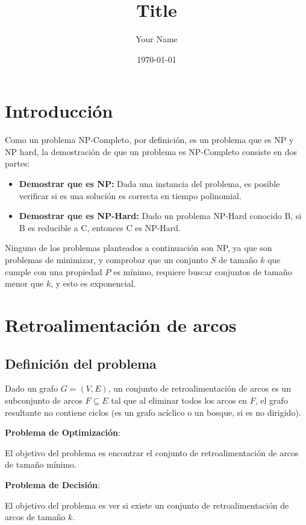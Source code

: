 \documentclass{article}
\title{Title}
\author{Your Name}
\date{\today}
\begin{document}
\maketitle

\tableofcontents

\newpage
\section{Introducción}
Como un problema NP-Completo, por definición, es un problema que es NP y NP hard, la demostración de que un problema es NP-Completo consiste en dos partes:

\begin{itemize}
\item \textbf{Demostrar que es NP:}
Dada una instancia del problema, es posible verificar si es una solución es correcta en tiempo polinomial.
\item \textbf{Demostrar que es NP-Hard:}
Dado un problema NP-Hard conocido B, si B es reducible a C, entonces C es NP-Hard.
\end{itemize}

Ninguno de los problemas planteados a continuación son NP, ya que son problemas de minimizar, y comprobar que un conjunto \(S\) de tamaño \(k\) que cumple con una propiedad \(P\) es mínimo, requiere buscar conjuntos de tamaño menor que  \(k\), y esto es exponencial.

\section{Retroalimentación de arcos}

    \subsection{Definición del problema}
    Dado un grafo $G=(V,E)$, un conjunto de retroalimentación de arcos es un subconjunto de arcos $F \subseteq E$ tal que al eliminar todos los arcos en $F$, el grafo resultante no contiene ciclos (es un grafo acíclico o un bosque, si es no dirigido).

    \textbf{Problema de Optimización}:
    
    El objetivo del problema es encontrar el conjunto de retroalimentación de arcos de tamaño mínimo.

    \textbf{Problema de Decisión}:
    
    El objetivo del problema es ver si existe un conjunto de retroalimentación de arcos de tamaño $k$.
    
\end{document}
